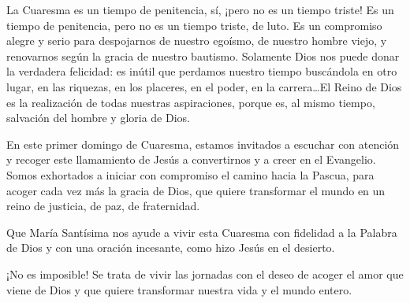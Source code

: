 \begin{body}
La Cuaresma es un tiempo de penitencia, sí, ¡pero no es un tiempo triste! Es un tiempo de penitencia, pero no es un tiempo triste, de luto. Es un compromiso alegre y serio para despojarnos de nuestro egoísmo, de nuestro hombre viejo, y renovarnos según la gracia de nuestro bautismo. Solamente Dios nos puede donar la verdadera felicidad: es inútil que perdamos nuestro tiempo buscándola en otro lugar, en las riquezas, en los placeres, en el poder, en la carrera\ldots El Reino de Dios es la realización de todas nuestras aspiraciones, porque es, al mismo tiempo, salvación del hombre y gloria de Dios.

En este primer domingo de Cuaresma, estamos invitados a escuchar con atención y recoger este llamamiento de Jesús a convertirnos y a creer en el Evangelio. Somos exhortados a iniciar con compromiso el camino hacia la Pascua, para acoger cada vez más la gracia de Dios, que quiere transformar el mundo en un reino de justicia, de paz, de fraternidad.

Que María Santísima nos ayude a vivir esta Cuaresma con fidelidad a la Palabra de Dios y con una oración incesante, como hizo Jesús en el desierto.

¡No es imposible! Se trata de vivir las jornadas con el deseo de acoger el amor que viene de Dios y que quiere transformar nuestra vida y el mundo entero.
\end{body}

